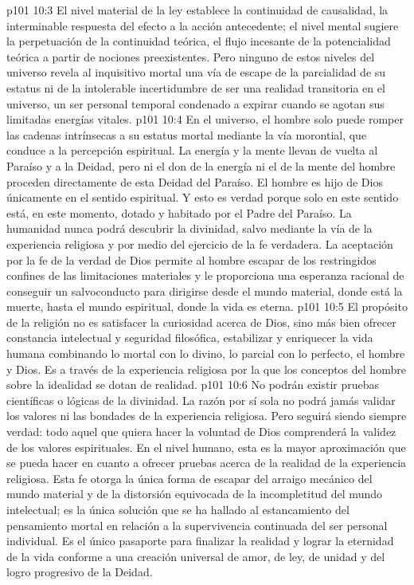 \vs p101 10:3 El nivel material de la ley establece la continuidad de causalidad, la interminable respuesta del efecto a la acción antecedente; el nivel mental sugiere la perpetuación de la continuidad teórica, el flujo incesante de la potencialidad teórica a partir de nociones preexistentes. Pero ninguno de estos niveles del universo revela al inquisitivo mortal una vía de escape de la parcialidad de su estatus ni de la intolerable incertidumbre de ser una realidad transitoria en el universo, un ser personal temporal condenado a expirar cuando se agotan sus limitadas energías vitales.
\vs p101 10:4 En el universo, el hombre solo puede romper las cadenas intrínsecas a su estatus mortal mediante la vía morontial, que conduce a la percepción espiritual. La energía y la mente llevan de vuelta al Paraíso y a la Deidad, pero ni el don de la energía ni el de la mente del hombre proceden directamente de esta Deidad del Paraíso. El hombre es hijo de Dios únicamente en el sentido espiritual. Y esto es verdad porque solo en este sentido está, en este momento, dotado y habitado por el Padre del Paraíso. La humanidad nunca podrá descubrir la divinidad, salvo mediante la vía de la experiencia religiosa y por medio del ejercicio de la fe verdadera. La aceptación por la fe de la verdad de Dios permite al hombre escapar de los restringidos confines de las limitaciones materiales y le proporciona una esperanza racional de conseguir un salvoconducto para dirigirse desde el mundo material, donde está la muerte, hasta el mundo espiritual, donde la vida es eterna.
\vs p101 10:5 \pc El propósito de la religión no es satisfacer la curiosidad acerca de Dios, sino más bien ofrecer constancia intelectual y seguridad filosófica, estabilizar y enriquecer la vida humana combinando lo mortal con lo divino, lo parcial con lo perfecto, el hombre y Dios. Es a través de la experiencia religiosa por la que los conceptos del hombre sobre la idealidad se dotan de realidad.
\vs p101 10:6 \pc No podrán existir pruebas científicas o lógicas de la divinidad. La razón por sí sola no podrá jamás validar los valores ni las bondades de la experiencia religiosa. Pero seguirá siendo siempre verdad: todo aquel que quiera hacer la voluntad de Dios comprenderá la validez de los valores espirituales. En el nivel humano, esta es la mayor aproximación que se pueda hacer en cuanto a ofrecer pruebas acerca de la realidad de la experiencia religiosa. Esta fe otorga la única forma de escapar del arraigo mecánico del mundo material y de la distorsión equivocada de la incompletitud del mundo intelectual; es la única solución que se ha hallado al estancamiento del pensamiento mortal en relación a la supervivencia continuada del ser personal individual. Es el único pasaporte para finalizar la realidad y lograr la eternidad de la vida conforme a una creación universal de amor, de ley, de unidad y del logro progresivo de la Deidad.
